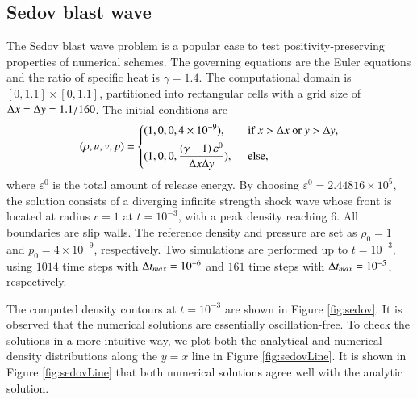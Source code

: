 \subsection{Sedov blast wave}
\label{ssec:sedov}

The Sedov blast wave problem \cite{zhang2012positivity,vilar2016positivity} is a popular case to test positivity-preserving properties of
numerical schemes.
The governing equations are the Euler equations and the ratio of specific heat is $\gamma = 1.4$. The computational domain is $[0,1.1]\times[0,1.1]$, partitioned into rectangular cells with a grid size of $\mathrm\Delta x = \mathrm\Delta y = 1.1/160$. The initial conditions are
\begin{equation}
    (\rho,u,v,p) = \begin{dcases}
        (1,0,0,4\times 10 ^{-9}),\ \                                          & \text{if } x > \inc x \ \mathrm{or} \ y > \inc y, \\
        (1,0,0,\dfrac{\left(\gamma-1\right)\varepsilon^0}{\inc x\inc y}),\ \  & \text{else},                                      \\
    \end{dcases}
\end{equation}
where $\varepsilon^0$ is the total amount of release energy.
By choosing $\varepsilon^0= 2.44816\times 10^5$,
the solution consists of a diverging infinite strength shock wave
whose front is located at radius $r=1$ at $t=10^{-3}$, with a peak density reaching $6$.
All boundaries are slip walls.
The reference density and pressure are set as $\rho_0=1$ and $p_0=4\times10^{-9}$, respectively.
Two simulations are performed up to $t=10^{-3}$,
using $1014$ time steps with $\mathrm\Delta t_{max} = 10^{-6}$
and  $161$ time steps with $\mathrm\Delta t_{max} = 10^{-5}$, respectively.

The computed density contours at $t=10^{-3}$ are shown in Figure \ref{fig:sedov}. It is observed that the numerical solutions are essentially oscillation-free. To check the solutions in a more intuitive way, we plot both the analytical and numerical density distributions along the $y=x$ line in Figure \ref{fig:sedovLine}.
It is shown in Figure \ref{fig:sedovLine} that both numerical solutions agree well with the analytic solution.

